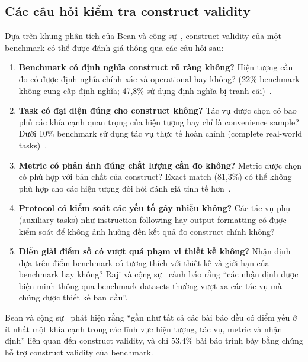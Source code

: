 \subsection{Các câu hỏi kiểm tra construct validity}
\label{sec:cv_checklist}

Dựa trên khung phân tích của Bean và cộng sự~\cite{measuring_what_matters}, construct validity của một benchmark có thể được đánh giá thông qua các câu hỏi sau:

\begin{enumerate}
    \item \textbf{Benchmark có định nghĩa construct rõ ràng không?} Hiện tượng cần đo có được định nghĩa chính xác và operational hay không? (22\% benchmark không cung cấp định nghĩa; 47,8\% sử dụng định nghĩa bị tranh cãi)~\cite{measuring_what_matters}.
    
    \item \textbf{Task có đại diện đúng cho construct không?} Tác vụ được chọn có bao phủ các khía cạnh quan trọng của hiện tượng hay chỉ là convenience sample? Dưới 10\% benchmark sử dụng tác vụ thực tế hoàn chỉnh (complete real-world tasks)~\cite{measuring_what_matters}.
    
    \item \textbf{Metric có phản ánh đúng chất lượng cần đo không?} Metric được chọn có phù hợp với bản chất của construct? Exact match (81,3\%) có thể không phù hợp cho các hiện tượng đòi hỏi đánh giá tinh tế hơn~\cite{measuring_what_matters}.
    
    \item \textbf{Protocol có kiểm soát các yếu tố gây nhiễu không?} Các tác vụ phụ (auxiliary tasks) như instruction following hay output formatting có được kiểm soát để không ảnh hưởng đến kết quả đo construct chính không?~\cite{measuring_what_matters}
    
    \item \textbf{Diễn giải điểm số có vượt quá phạm vi thiết kế không?} Nhận định dựa trên điểm benchmark có tương thích với thiết kế và giới hạn của benchmark hay không? Raji và cộng sự~\cite{everything_benchmark} cảnh báo rằng ``các nhận định được biện minh thông qua benchmark datasets thường vượt xa các tác vụ mà chúng được thiết kế ban đầu''.
\end{enumerate}

Bean và cộng sự~\cite{measuring_what_matters} phát hiện rằng ``gần như tất cả các bài báo đều có điểm yếu ở ít nhất một khía cạnh trong các lĩnh vực hiện tượng, tác vụ, metric và nhận định'' liên quan đến construct validity, và chỉ 53,4\% bài báo trình bày bằng chứng hỗ trợ construct validity của benchmark.